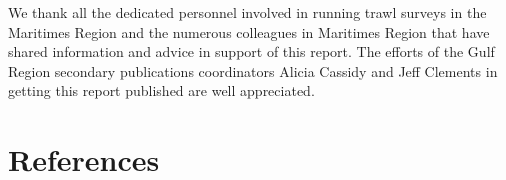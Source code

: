 \documentclass[12pt]{article}\usepackage[]{graphicx}\usepackage[]{color}
\begin{document}
We thank all the dedicated personnel involved in running trawl surveys in the Maritimes Region and the numerous colleagues in Maritimes Region that have shared information and advice in support of this report. The efforts of the Gulf Region secondary publications coordinators Alicia Cassidy and Jeff Clements in getting this report published are well appreciated.

\clearpage

\hypertarget{references}{%
\section{References}\label{references}}

\noindent \vspace{-2em} \setlength{\parindent}{-0.2in} \setlength{\leftskip}{0.2in} \setlength{\parskip}{8pt}
\end{document}
